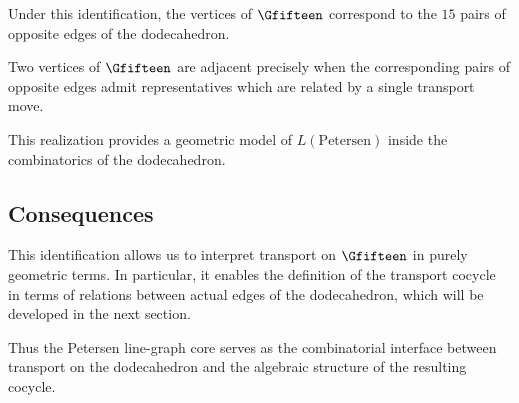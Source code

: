 Under this identification, the vertices of $\Gfifteen$ correspond to the
$15$ pairs of opposite edges of the dodecahedron.

Two vertices of $\Gfifteen$ are adjacent precisely when the corresponding
pairs of opposite edges admit representatives which are related by a
single transport move.

This realization provides a geometric model of $L(\mathrm{Petersen})$
inside the combinatorics of the dodecahedron.

\subsection{Consequences}

This identification allows us to interpret transport on $\Gfifteen$ in
purely geometric terms. In particular, it enables the definition of the
transport cocycle in terms of relations between actual edges of the
dodecahedron, which will be developed in the next section.

Thus the Petersen line-graph core serves as the combinatorial interface
between transport on the dodecahedron and the algebraic structure of the
resulting cocycle.
